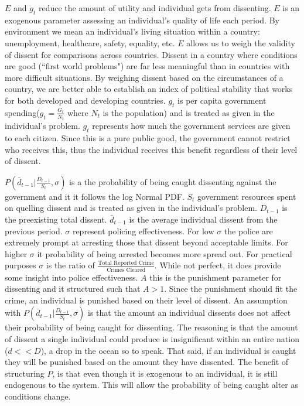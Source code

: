 \documentclass[12pt]{article}
\begin{document}
\begin{spacing}{1.5}
$E$ and $g_t$ reduce the amount of utility and individual gets from dissenting. $E$ is an exogenous parameter assessing an individual's quality of life each period. By environment we mean an individual's living situation within a country: unemployment, healthcare, safety, equality, etc. $E$ allows us to weigh the validity of dissent for comparisons across countries. Dissent in a country where conditions are good (``first world problems")  are far less meaningful than in countries with more difficult situations. By weighing dissent based on the circumstances of a country, we are better able to establish an index of political stability that works for both developed and developing countries. $g_t$ is per capita government spending($g_t=\frac{G_t}{N_t}$ where $N_t$ is the population) and is treated as given in the individual's problem. $g_t$ represents how much the government services are given to each citizen. Since this is a pure public good, the government cannot restrict who receives this, thus the individual receives this benefit regardless of their level of dissent. 

$ P \left( \bar{d}_{t-1} \Bigg|\frac{D_{t-1}}{S_t},\sigma \right)$ is a the probability of being caught dissenting against the government and it it follows the log Normal PDF. $S_t$ government resources spent on quelling dissent and is treated as given in the individual's problem. $D_{t-1}$ is the preexisting total dissent. $\bar{d}_{t-1}$ is the average individual dissent from the previous period. $\sigma$ represent policing effectiveness. For low $\sigma$ the police are extremely prompt at arresting those that dissent beyond acceptable limits. For higher $\sigma$ it probability of being arrested becomes more spread out. For practical purposes $\sigma$ is the ratio of $\frac{\text{Total Reported Crime}}{\text{Crimes Cleared}}$. While not perfect, it does provide some insight into police effectiveness. $A$ this is the punishment parameter for dissenting and it structured such that $A>1$. Since the punishment should fit the crime, an individual is punished based on their level of dissent. An assumption with $P \left( \bar{d}_{t-1} \Bigg|\frac{D_{t-1}}{S_t},\sigma \right)$ is that the amount an individual dissents does not affect their probability of being caught for dissenting. The reasoning is that the amount of dissent a single individual could produce is insignificant within an entire nation ($d<<D$), a drop in the ocean so to speak. That said, if an individual is caught they will be punished based on the amount they have dissented. The benefit of structuring $P$, is that even though it is exogenous to an individual, it is still endogenous to the system. This will allow the probability of being caught alter as conditions change.   




\end{spacing}
\end{document}
